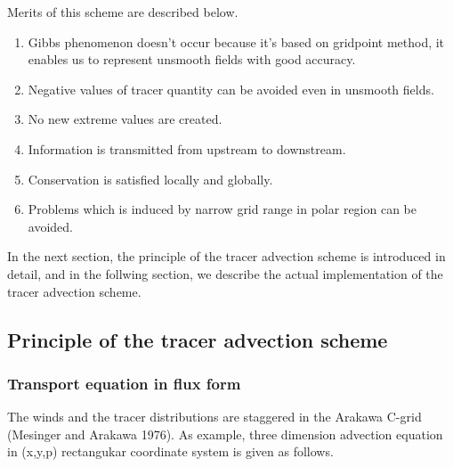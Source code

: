\documentclass{article}
\begin{document}
Merits of this scheme are described below.
\begin{enumerate}
\item Gibbs phenomenon doesn't occur because it's based on gridpoint method, it enables us to represent unsmooth fields with good accuracy. 
\item Negative values of tracer quantity can be avoided even in unsmooth fields.
\item No new extreme values are created.
\item Information is transmitted from upstream to downstream.
\item Conservation is satisfied locally and globally.
\item Problems which is induced by narrow grid range in polar region can be avoided.
\end{enumerate}
In the next section, the principle of the tracer advection scheme is introduced in detail, and in the follwing section, we describe the actual implementation of the tracer advection scheme.

\subsection{Principle of the tracer advection scheme}
\subsubsection{Transport equation in flux form}
The winds and the tracer distributions are staggered in the Arakawa C-grid (Mesinger and Arakawa 1976).
As example, three dimension advection equation in (x,y,p) rectangukar coordinate system is given as follows. 
\end{document}
